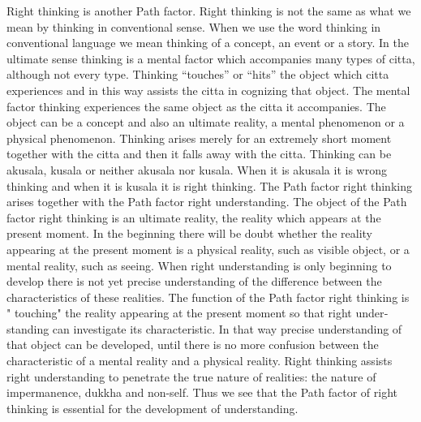 \documentclass{book}
\begin{document}
Right thinking is another Path factor. Right thinking is not the same as
what we mean by thinking in conventional sense. When we use the word
thinking in conventional language we mean thinking of a concept, an
event or a story. In the ultimate sense thinking is a mental factor
which accompanies many types of citta, although not every type. Thinking
``touches'' or ``hits'' the object which citta experiences and in this
way assists the citta in cognizing that object. The mental factor
thinking expe­riences the same object as the citta it accompanies. The
object can be a concept and also an ultimate reality, a mental
phenomenon or a physical phenomenon. Thinking arises merely for an
extremely short moment together with the citta and then it falls away
with the citta. Thinking can be akusala, kusala or neither akusala nor
kusala. When it is akusala it is wrong thinking and when it is kusala it
is right thinking. The Path factor right thinking arises together with
the Path factor right understanding. The object of the Path factor right
thinking is an ultimate reality, the reality which appears at the
present moment. In the beginning there will be doubt whether the reality
appearing at the present moment is a physical reality, such as visible
object, or a mental reality, such as seeing. When right understanding is
only beginning to develop there is not yet precise understanding of the
difference between the characteristics of these realities. The function
of the Path factor right thinking is " touching" the reality appearing
at the present moment so that right under­standing can investigate its
characteristic. In that way precise understanding of that object can be
developed, until there is no more confusion between the characteristic
of a mental reality and a physical reality. Right thinking assists right
understanding to penetrate the true nature of realities: the nature of
impermanence, dukkha and non-self. Thus we see that the Path factor of
right thinking is essential for the development of understanding.
\end{document}
